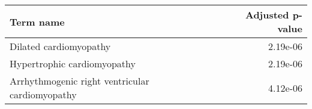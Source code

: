 \begin{tabular}{lr}
\toprule
                                      Term name &  Adjusted p-value \\
\midrule
                         Dilated cardiomyopathy &          2.19e-06 \\
                    Hypertrophic cardiomyopathy &          2.19e-06 \\
Arrhythmogenic right ventricular cardiomyopathy &          4.12e-06 \\
\bottomrule
\end{tabular}
